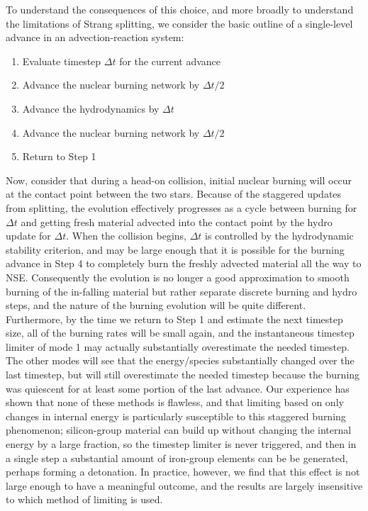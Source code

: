 \documentclass[twocolumn,numberedappendix]{../aastex6}
\begin{document}
To understand the consequences of this choice, and more broadly to 
understand the limitations of Strang splitting, we consider the 
basic outline of a single-level advance in an advection-reaction system:
\begin{enumerate}
  \item Evaluate timestep $\Delta t$ for the current advance
  \item Advance the nuclear burning network by $\Delta t / 2$
  \item Advance the hydrodynamics by $\Delta t$
  \item Advance the nuclear burning network by $\Delta t / 2$
  \item Return to Step 1
\end{enumerate}
Now, consider that during a head-on collision, initial nuclear burning 
will occur at the contact point between the two stars. Because of 
the staggered updates from splitting, the evolution effectively progresses 
as a cycle between burning for $\Delta t$ and getting fresh material 
advected into the contact point by the hydro update for $\Delta t$. 
When the collision begins, $\Delta t$ is controlled by the hydrodynamic 
stability criterion, and may be large enough that it is possible for 
the burning advance in Step 4 to completely burn the freshly advected 
material all the way to NSE. Consequently the evolution is no longer 
a good approximation to smooth burning of the in-falling material but
rather separate discrete burning and hydro steps, and the nature of 
the burning evolution will be quite different. Furthermore, by the 
time we return to Step 1 and estimate the next timestep size, all 
of the burning rates will be small again, and the instantaneous 
timestep limiter of mode 1 may actually substantially overestimate 
the needed timestep. The other modes will see that the energy/species  
substantially changed over the last timestep, but will still
overestimate the needed timestep because the burning was quiescent
for at least some portion of the last advance. Our experience has
shown that none of these methods is flawless, and that limiting
based on only changes in internal energy is particularly susceptible
to this staggered burning phenomenon; silicon-group material can
build up without changing the internal energy by a  large fraction,
so the timestep limiter is never triggered, and then in a single step
a substantial amount of iron-group elements can be be generated,
perhaps forming a detonation. In practice, however, we find that
this effect is not large enough to have a meaningful outcome, and
the results are largely insensitive to which method of limiting
is used.
\end{document}
